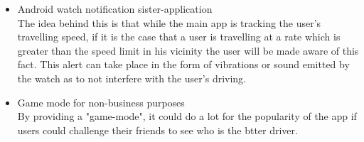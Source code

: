 \begin{itemize}
	\item Android watch notification sister-application\\
	The idea behind this is that while the main app is tracking the user's travelling speed, if it is the case that a user is travelling at a rate which is greater than the speed limit in his vicinity the user will be made aware of this fact. This alert can take place in the form of vibrations or sound emitted by the watch as to not interfere with the user's driving.
	
	\item Game mode for non-business purposes\\
	By providing a "game-mode", it could do a lot for the popularity of the app if users could challenge their friends to see who is the btter driver.
\end{itemize}